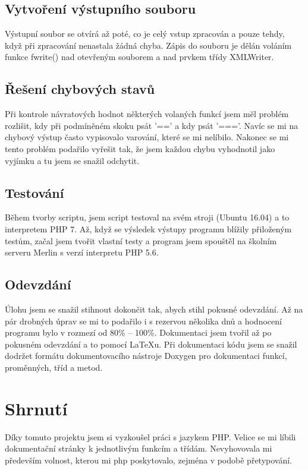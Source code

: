 \documentclass[a4paper, 10pt]{article}
\begin{document}
        \subsection{Vytvoření výstupního souboru}
            Výstupní soubor se otvírá až poté, co je celý vstup zpracován a pouze
            tehdy, když při zpracování nenastala žádná chyba. Zápis do souboru
            je dělán voláním funkce fwrite() nad otevřeným souborem a nad prvkem
            třídy XMLWriter.
        \subsection{Řešení chybových stavů}
            Při kontrole návratových hodnot některých volaných funkcí jsem měl
            problém rozlišit, kdy při podmíněném skoku psát '==' a kdy psát '==='.
            Navíc se mi na chybový výstup často vypisovalo varování, které se mi
            nelíbilo. Nakonec se mi tento problém podařilo vyřešit tak, že jsem
            každou chybu vyhodnotil jako vyjímku a tu jsem se snažil odchytit.
        \subsection{Testování}
            Během tvorby scriptu, jsem script testoval na svém stroji (Ubuntu 16.04)
            a to interpretem PHP 7. Až, když se výsledek výstupy programu blížily
            přiloženým testům, začal jsem tvořit vlastní testy a program jsem spouštěl
            na školním serveru Merlin s verzí interpretu PHP 5.6.
        \subsection{Odevzdání}
            Úlohu jsem se snažil stihnout dokončit tak, abych stihl pokusné odevzdání.
            Až na pár drobných úprav se mi to podařilo i s rezervou několika dnů
            a hodnocení programu bylo v rozmezí od 80\% -- 100\%. Dokumentaci jsem
            tvořil až po pokusném odevzdání a to pomocí \LaTeX u. Při dokumentaci kódu jsem se snažil
            dodržet formátu dokumentovacího nástroje Doxygen pro dokumentaci funkcí,
            proměnných, tříd a metod.
    \section{Shrnutí}
        Díky tomuto projektu jsem si vyzkoušel práci s jazykem PHP. Velice se mi
        líbili dokumentační stránky k jednotlivým funkcím a třídám. Nevyhovovala
        mi především volnost, kterou mi php poskytovalo, zejména v podobě
        přetypování.
\end{document}
